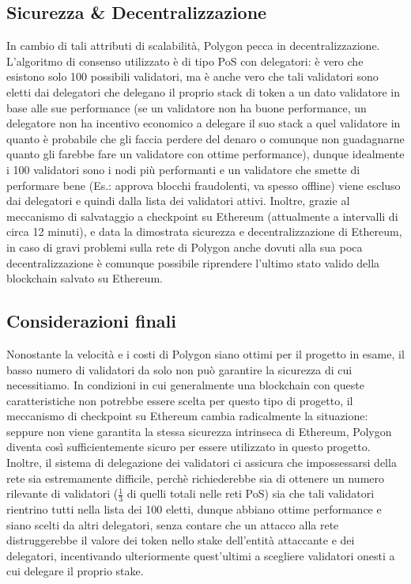 \documentclass[a4paper, 12pt]{article}
\begin{document}
\subsection*{Sicurezza \& Decentralizzazione}
In cambio di tali attributi di scalabilità, Polygon pecca in decentralizzazione.
L'algoritmo di consenso utilizzato è di tipo PoS con delegatori: è vero che esistono solo 100 possibili validatori, ma è anche vero che tali validatori sono eletti dai delegatori che delegano il proprio stack di token a un dato validatore in base alle sue performance (se un validatore non ha buone performance, un delegatore non ha incentivo economico a delegare il suo stack a quel validatore in quanto è probabile che gli faccia perdere del denaro o comunque non guadagnarne quanto gli farebbe fare un validatore con ottime performance), dunque idealmente i 100 validatori sono i nodi più performanti e un validatore che smette di performare bene (Es.: approva blocchi fraudolenti, va spesso offline) viene escluso dai delegatori e quindi dalla lista dei validatori attivi.
Inoltre, grazie al meccanismo di salvataggio a checkpoint su Ethereum (attualmente a intervalli di circa 12 minuti), e data la dimostrata sicurezza e decentralizzazione di Ethereum,
in caso di gravi problemi sulla rete di Polygon anche dovuti alla sua poca decentralizzazione è comunque possibile riprendere l'ultimo stato valido della blockchain salvato su Ethereum.

\subsection*{Considerazioni finali}
Nonostante la velocità e i costi di Polygon siano ottimi per il progetto in esame, il basso numero di validatori da solo non può garantire la sicurezza di cui necessitiamo.
In condizioni in cui generalmente una blockchain con queste caratteristiche non potrebbe essere scelta per questo tipo di progetto, il meccanismo di checkpoint su Ethereum cambia radicalmente la situazione: seppure non viene garantita la stessa sicurezza intrinseca di Ethereum, Polygon diventa così sufficientemente sicuro per essere utilizzato in questo progetto.
Inoltre, il sistema di delegazione dei validatori ci assicura che impossessarsi della rete sia estremamente difficile, perchè richiederebbe sia di ottenere un numero rilevante di validatori ($\frac{1}{3}$ di quelli totali nelle reti PoS) sia che tali validatori rientrino tutti nella lista dei 100 eletti, dunque abbiano ottime performance e siano scelti da altri delegatori,
senza contare che un attacco alla rete distruggerebbe il valore dei token nello stake dell'entità attaccante e dei delegatori, incentivando ulteriormente quest'ultimi a scegliere validatori onesti a cui delegare il proprio stake.
\end{document}
